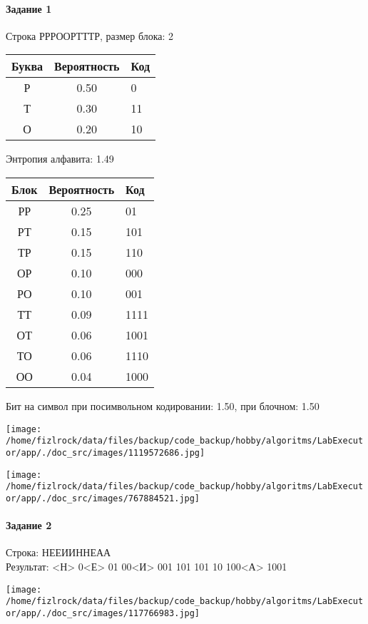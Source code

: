 \documentclass[a4paper, 12pt]{article}
\begin{document}
\paragraph{Задание 1}

Строка РРРООРТТТР, размер блока: 2
\begin{center}
 \begin{tabular}{ |c|c|l| } 
  \hline
     Буква & Вероятность & Код\\ \hline
Р & 0.50 & 0\\\hline
Т & 0.30 & 11\\\hline
О & 0.20 & 10
\\ \hline \end{tabular}
\end{center}
Энтропия алфавита: 1.49
\begin{center}
 \begin{tabular}{ |c|c|l| } 
  \hline
     Блок & Вероятность & Код\\ \hline
РР & 0.25 & 01\\\hline
РТ & 0.15 & 101\\\hline
ТР & 0.15 & 110\\\hline
ОР & 0.10 & 000\\\hline
РО & 0.10 & 001\\\hline
ТТ & 0.09 & 1111\\\hline
ОТ & 0.06 & 1001\\\hline
ТО & 0.06 & 1110\\\hline
ОО & 0.04 & 1000
\\ \hline \end{tabular}
\end{center}
Бит на символ при посимвольном кодировании: 1.50, при блочном: 1.50

\texttt{[image: /home/fizlrock/data/files/backup/code\_backup/hobby/algoritms/LabExecutor/app/./doc\_src/images/1119572686.jpg]}

\texttt{[image: /home/fizlrock/data/files/backup/code\_backup/hobby/algoritms/LabExecutor/app/./doc\_src/images/767884521.jpg]}
\pagebreak
\paragraph{Задание 2}

Строка: 
НЕЕИИННЕАА\\
Результат: <Н> 0<Е> 01 00<И> 001 101 101 10 100<А> 1001

\texttt{[image: /home/fizlrock/data/files/backup/code\_backup/hobby/algoritms/LabExecutor/app/./doc\_src/images/117766983.jpg]}
\end{document}
